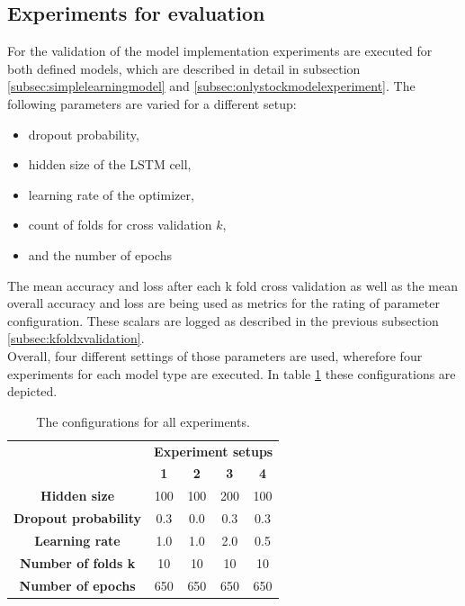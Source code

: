 \subsection{Experiments for evaluation}
\label{subsec:experiments}
For the validation of the model implementation experiments are executed for both defined models, which are described in detail in subsection \ref{subsec:simplelearningmodel} and \ref{subsec:onlystockmodelexperiment}. The following parameters are varied for a different setup: 
\begin{itemize}
	\item dropout probability, 
	\item hidden size of the LSTM cell, 
	\item learning rate of the optimizer, 
	\item count of folds for cross validation $k$, 
	\item and the number of epochs
\end{itemize}
The mean accuracy and loss after each k fold cross validation as well as the mean overall accuracy and loss are being used as metrics for the rating of parameter configuration. These scalars are logged as described in the previous subsection \ref{subsec:kfoldxvalidation}. 
\\
Overall, four different settings of those parameters are used, wherefore four experiments for each model type are executed. In table \ref{tbl:experiments} these configurations are depicted. 
\renewcommand{\arraystretch}{1.5}
\begin{table}[!ht]
	\begin{center}
		\begin{tabular}{c|c|c|c|c|}
			\multirow{2}{1cm}{} & \multicolumn{4}{c|}{\textbf{Experiment setups}} \\
			 & \textbf{1} & \textbf{2} & \textbf{3} & \textbf{4}\\
			\hline
			\textbf{Hidden size} & 100 &  100 & 200 & 100 \\
			\hline
			\textbf{Dropout probability} & 0.3 & 0.0 & 0.3 & 0.3 \\
			\hline
			\textbf{Learning rate} & 1.0 & 1.0 & 2.0 & 0.5 \\
			\hline
			\textbf{Number of folds k} & 10 & 10 & 10 & 10 \\
			\hline
			\textbf{Number of epochs} & 650 & 650 & 650 & 650 \\
		\end{tabular}
	\end{center}
	\caption{The configurations for all experiments. }
	\label{tbl:experiments}
\end{table}
